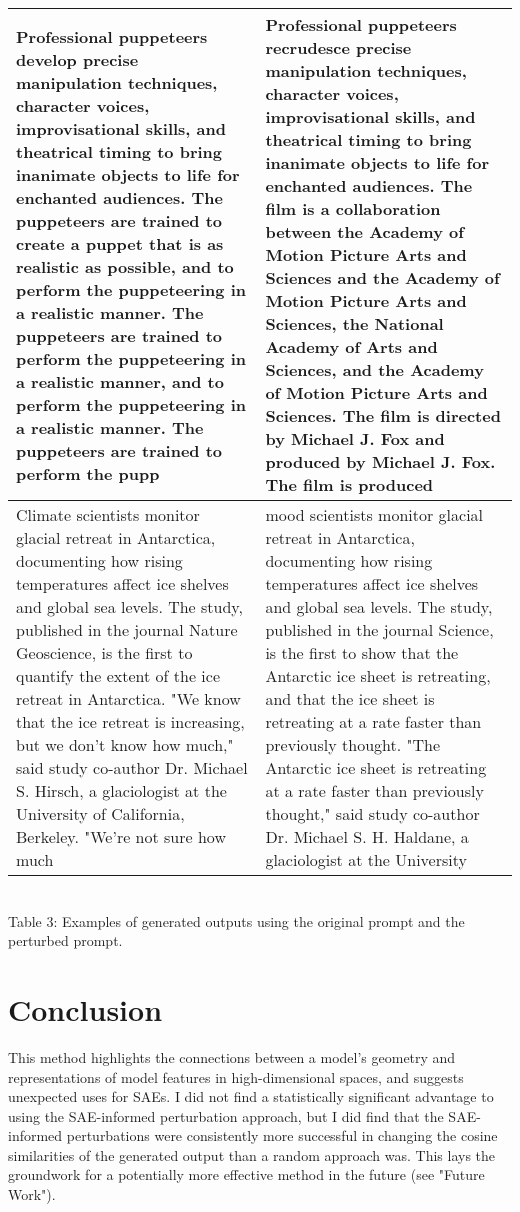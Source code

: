 \documentclass{article}
\begin{document}
\begin{center}
\begin{tabular}{|p{8cm} | p{8cm}|}
Professional puppeteers develop precise manipulation techniques, character voices, improvisational skills, and theatrical timing to bring inanimate objects to life for enchanted audiences. The puppeteers are trained to create a puppet that is as realistic as possible, and to perform the puppeteering in a realistic manner. The puppeteers are trained to perform the puppeteering in a realistic manner, and to perform the puppeteering in a realistic manner. The puppeteers are trained to perform the pupp & Professional puppeteers recrudesce precise manipulation techniques, character voices, improvisational skills, and theatrical timing to bring inanimate objects to life for enchanted audiences. The film is a collaboration between the Academy of Motion Picture Arts and Sciences and the Academy of Motion Picture Arts and Sciences, the National Academy of Arts and Sciences, and the Academy of Motion Picture Arts and Sciences. The film is directed by Michael J. Fox and produced by Michael J. Fox. The film is produced\\
\hline
Climate scientists monitor glacial retreat in Antarctica, documenting how rising temperatures affect ice shelves and global sea levels. The study, published in the journal Nature Geoscience, is the first to quantify the extent of the ice retreat in Antarctica. "We know that the ice retreat is increasing, but we don't know how much," said study co-author Dr. Michael S. Hirsch, a glaciologist at the University of California, Berkeley. "We're not sure how much & mood scientists monitor glacial retreat in Antarctica, documenting how rising temperatures affect ice shelves and global sea levels. The study, published in the journal Science, is the first to show that the Antarctic ice sheet is retreating, and that the ice sheet is retreating at a rate faster than previously thought. "The Antarctic ice sheet is retreating at a rate faster than previously thought," said study co-author Dr. Michael S. H. Haldane, a glaciologist at the University\\
\hline
\end{tabular}
\scriptsize
    \\ Table 3: Examples of generated outputs using the original prompt and the perturbed prompt.
\end{center}

\section*{Conclusion}

This method highlights the connections between a model's geometry and representations of model features in high-dimensional spaces, and suggests unexpected uses for SAEs. I did not find a statistically significant advantage to using the SAE-informed perturbation approach, but I did find that the SAE-informed perturbations were consistently more successful in changing the cosine similarities of the generated output than a random approach was. This lays the groundwork for a potentially more effective method in the future (see "Future Work"). 
\end{document}
